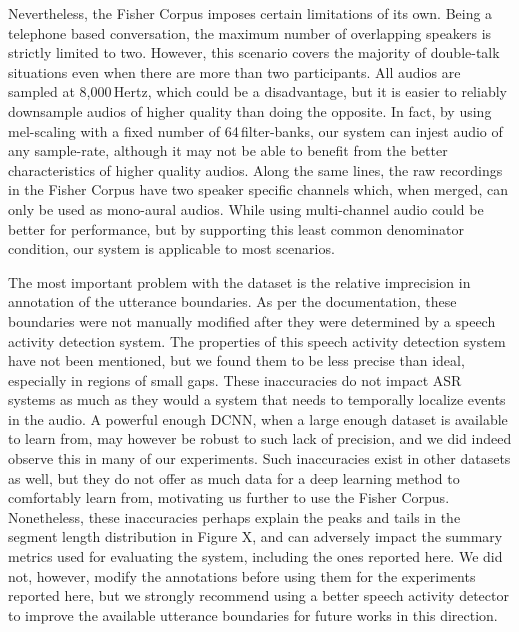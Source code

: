 \documentclass[a4paper]{article}
\begin{document}
Nevertheless, the Fisher Corpus imposes certain limitations of its own.
Being a telephone based conversation, the maximum number of overlapping speakers is strictly limited to two.
However, this scenario covers the majority of double-talk situations even when there are more than two participants.  %
All audios are sampled at 8,000\,Hertz, which could be a disadvantage,
but it is easier to reliably downsample audios of higher quality than doing the opposite.
In fact, by using mel-scaling with a fixed number of 64\,filter-banks,
our system can injest audio of any sample-rate,
although it may not be able to benefit from the better characteristics of higher quality audios.
Along the same lines, the raw recordings in the Fisher Corpus have two speaker specific channels which, when merged,
can only be used as mono-aural audios.
While using multi-channel audio could be better for performance,
but by supporting this least common denominator condition,
our system is applicable to most scenarios.

The most important problem with the dataset is the relative imprecision in annotation of the utterance boundaries.
As per the documentation,
these boundaries were not manually modified after they were determined by a speech activity detection system.   %
The properties of this speech activity detection system have not been mentioned,
but we found them to be less precise than ideal, especially in regions of small gaps.
These inaccuracies do not impact ASR systems as much as they would a system that needs to temporally localize events in the audio.
A powerful enough DCNN, when a large enough dataset is available to learn from,
may however be robust to such lack of precision,
and we did indeed observe this in many of our experiments.
Such inaccuracies exist in other datasets as well,
but they do not offer as much data for a deep learning method to comfortably learn from,
motivating us further to use the Fisher Corpus.
Nonetheless, these inaccuracies perhaps explain the peaks and tails in the segment length distribution in Figure X,  %
and can adversely impact the summary metrics used for evaluating the system, including the ones reported here.
We did not, however, modify the annotations before using them for the experiments reported here,
but we strongly recommend using a better speech activity detector to improve the available utterance boundaries for future works in this direction.

\end{document}
